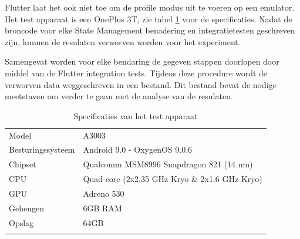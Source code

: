 Flutter laat het ook niet toe om de profile modus uit te voeren op een emulator.
Het test apparaat is een OnePlus 3T, zie tabel \ref{table:specifications-test-device} voor de specificaties.
Nadat de broncode voor elke State Management benadering en integratietesten geschreven zijn, kunnen de resulaten verworven worden voor het experiment.

Samengevat worden voor elke bendaring de gegeven stappen doorlopen door middel van de Flutter integration tests. Tijdens deze procedure wordt de verworven data weggeschreven in een bestand. Dit bestand bevat de nodige meetstaven om verder te gaan met de analyse van de resulaten.

\begin{table}[H]
    \centering
    \begin{tabular}{ll}
        Model & A3003 \\
        Besturingssysteem & Android 9.0 - OxygenOS 9.0.6 \\
        Chipset & Qualcomm MSM8996 Snapdragon 821 (14 nm)  \\
        CPU & Quad-core (2x2.35 GHz Kryo \& 2x1.6 GHz Kryo) \\
        GPU &  Adreno 530 \\
        Geheugen & 6GB RAM \\
        Opslag & 64GB \\ 
        &
    \end{tabular}
    \caption{Specificaties van het test apparaat}
    \label{table:specifications-test-device}
\end{table}

